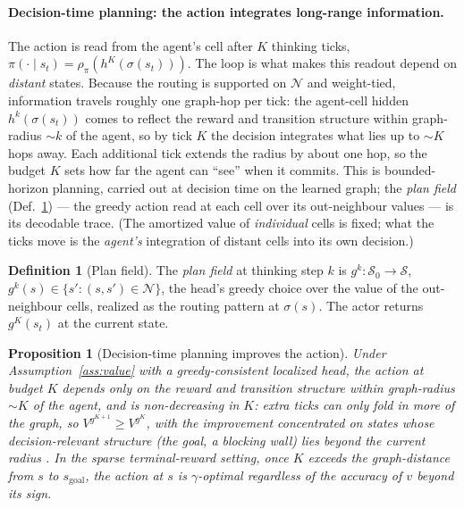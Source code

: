 \documentclass{article} %
\theoremstyle{plain}
\newtheorem{proposition}[theorem]{Proposition}
\theoremstyle{definition}
\newtheorem{definition}{Definition}[section]
\begin{document}
\paragraph{Decision-time planning: the action integrates long-range information.}
The action is read from the agent's cell after $K$ thinking ticks,
$\pi(\cdot\mid s_t)=\rho_\pi(h^{K}(\sigma(s_t)))$. The loop is what makes this
readout depend on \emph{distant} states. Because the routing is supported on
$\mathcal N$ and weight-tied, information travels roughly one graph-hop per tick:
the agent-cell hidden $h^{k}(\sigma(s_t))$ comes to reflect the reward and
transition structure within graph-radius ${\sim}k$ of the agent, so by tick $K$ the
decision integrates what lies up to ${\sim}K$ hops away. Each additional tick
extends the radius by about one hop, so the budget $K$ sets how far the agent can
``see'' when it commits. This is bounded-horizon planning, carried out at decision
time on the learned graph; the \emph{plan field} (Def.~\ref{def:planfield}) --- the
greedy action read at each cell over its out-neighbour values --- is its decodable
trace. (The amortized value of \emph{individual} cells is fixed; what the ticks
move is the \emph{agent's} integration of distant cells into its own decision.)

\begin{definition}[Plan field]
\label{def:planfield}
The \emph{plan field} at thinking step $k$ is $g^{k}:\mathcal S_0\to\mathcal S$,
$g^{k}(s)\in\{s':(s,s')\in\mathcal N\}$, the head's greedy choice over the value of
the out-neighbour cells, realized as the routing pattern at $\sigma(s)$. The actor
returns $g^{K}(s_t)$ at the current state.
\end{definition}

\begin{proposition}[Decision-time planning improves the action]
\label{prop:improvement}
Under Assumption~\ref{ass:value} with a greedy-consistent localized head, the action
at budget $K$ depends only on the reward and transition structure within
graph-radius ${\sim}K$ of the agent, and is non-decreasing in $K$: extra ticks can
only fold in more of the graph, so $V^{g^{K+1}}\ge V^{g^{K}}$, with the improvement
concentrated on states whose decision-relevant structure (the goal, a blocking
wall) lies beyond the current radius \citep[cf.\ multi-step improvement;][]
{efroni2018beyond}. In the sparse terminal-reward setting, once $K$ exceeds the
graph-distance from $s$ to $s_{\text{goal}}$, the action at $s$ is $\gamma$-optimal
regardless of the accuracy of $v$ beyond its sign.
\end{proposition}
\end{document}
